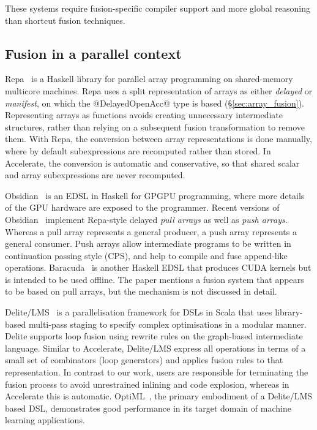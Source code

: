 These systems require fusion-specific compiler support and more global reasoning
than shortcut fusion techniques.


\subsection{Fusion in a parallel context}

Repa~\cite{Keller:2010er} is a Haskell library for parallel array programming on
shared-memory multicore machines. Repa uses a split
representation of arrays as either \emph{delayed} or \emph{manifest}, on which
the @DelayedOpenAcc@ type is based (\S\ref{sec:array_fusion}). Representing
arrays as functions avoids creating unnecessary intermediate structures, rather
than relying on a subsequent fusion transformation to remove them. With Repa,
the conversion between array representations is done manually, where by default
subexpressions are recomputed rather than stored. In Accelerate, the conversion
is automatic and conservative, so that shared scalar and array subexpressions
are never recomputed.

Obsidian~\cite{Svensson:2008a} is an EDSL in Haskell for GPGPU programming,
where more details of the GPU hardware are exposed to the programmer. Recent
versions of Obsidian~\cite{Claessen:2012hl,Svensson:2013wd} implement Repa-style delayed
\emph{pull arrays} as well as \emph{push arrays}. Whereas a pull array
represents a general producer, a push array represents a general consumer. Push
arrays allow intermediate programs to be written in continuation passing style
(CPS), and help to compile and fuse append-like operations.
Baracuda~\cite{Larsen:2011fa} is another Haskell EDSL that produces CUDA kernels
but is intended to be used offline. The paper mentions a fusion system that
appears to be based on pull arrays, but the mechanism is not discussed in
detail.

Delite/LMS~\cite{Rompf:2013er} is a parallelisation framework for DSLs in Scala
that uses library-based multi-pass staging to specify complex optimisations in a
modular manner. Delite supports loop fusion using rewrite rules on the
graph-based intermediate language. Similar to Accelerate, Delite/LMS express all
operations in terms of a small set of combinators (loop generators) and applies
fusion rules to that representation. In contrast to our work, users are
responsible for terminating the fusion process to avoid unrestrained inlining
and code explosion, whereas in Accelerate this is automatic.
OptiML~\cite{Sujeeth:2011ti}, the primary embodiment of a Delite/LMS based DSL,
demonstrates good performance in its target domain of machine learning
applications.

